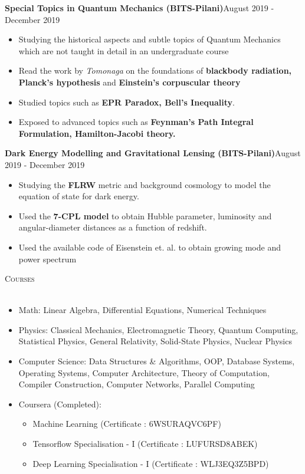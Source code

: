 \documentclass[a4paper]{article}
\newcommand{\lineunder} {
    \vspace*{-8pt} \\
    \hspace*{-18pt} \hrulefill \\
}
\newcommand{\header} [1] {
    {\hspace*{-18pt}\vspace*{6pt} \textsc{#1}}
    \vspace*{-6pt} \lineunder
}
\begin{document}
{\textbf{Special Topics in Quantum Mechanics (BITS-Pilani)}}\hfill August 2019 - December 2019\\
\begin{itemize} \itemsep 1pt
    \item Studying the historical aspects and subtle topics of Quantum Mechanics which are not taught in detail in an undergraduate course
    \item Read the work by \textit{Tomonaga} on the foundations of \textbf{blackbody radiation, Planck's hypothesis} and \textbf{Einstein's corpuscular theory}
    \item Studied topics such as \textbf{EPR Paradox, Bell's Inequality}.
    \item Exposed to advanced topics such as \textbf{Feynman's Path Integral Formulation, Hamilton-Jacobi theory.}
\end{itemize}
\vspace*{2mm}


{\textbf{Dark Energy Modelling and Gravitational Lensing (BITS-Pilani)}}\hfill August 2019 - December 2019\\
\begin{itemize} \itemsep 1pt
    \item Studying the \textbf{FLRW} metric and background cosmology to model the equation of state for dark energy.
    \item  Used the \textbf{7-CPL model} to obtain Hubble parameter, luminosity and angular-diameter distances as a function of redshift.
    \item Used the available code of Eisenstein et. al. to obtain growing mode and power spectrum
\end{itemize}
\vspace*{2mm}

\header{Courses}
\begin{itemize} \itemsep 1pt
	\item Math: Linear Algebra, Differential Equations, Numerical Techniques    
	\item Physics: Classical Mechanics, Electromagnetic Theory, Quantum Computing, Statistical Physics, General Relativity, Solid-State Physics, Nuclear Physics
	\item Computer Science: Data Structures \& Algorithms, OOP, Database Systems, Operating Systems, Computer Architecture, Theory of Computation, Compiler Construction, Computer Networks, Parallel Computing
	\item Coursera (Completed): 
	\begin{itemize}
	    \item Machine Learning (Certificate : 6WSURAQVC6PF)
	    \item Tensorflow Specialisation - I (Certificate : LUFURSD8ABEK)
	    \item Deep Learning Specialisation - I (Certificate : WLJ3EQ3Z5BPD)
	\end{itemize}
\end{itemize}
\vspace{2mm}
\end{document}
